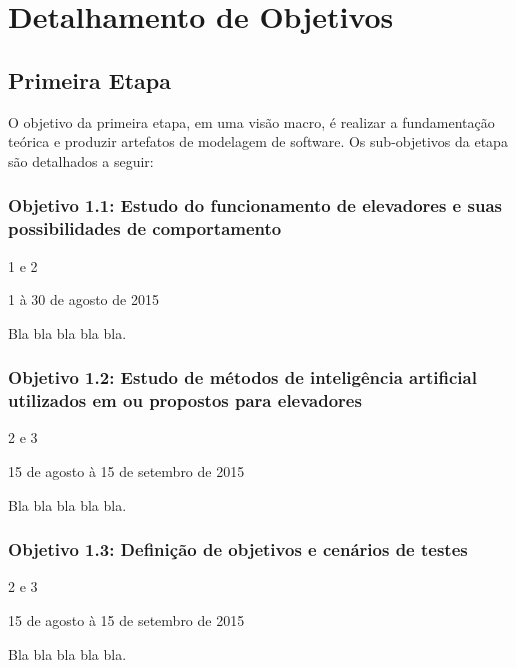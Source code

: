 \section{\label{section:objectives}Detalhamento de Objetivos}

\subsection{Primeira Etapa}

O objetivo da primeira etapa, em uma visão macro, é realizar a fundamentação
teórica e produzir artefatos de modelagem de software. Os sub-objetivos da etapa
são detalhados a seguir:

\subsubsection{\textbf{Objetivo 1.1}: Estudo do funcionamento de elevadores e suas possibilidades de comportamento}

\begin{description}[leftmargin=!,labelwidth=\widthof{\bfseries Descrição}]
  \item[Iterações] 1 e 2
  \item[Período]   1 à 30 de agosto de 2015
  \item[Descrição] Bla bla bla bla bla.
\end{description}

\subsubsection{\textbf{Objetivo 1.2}: Estudo de métodos de inteligência artificial utilizados em ou propostos para elevadores}

\begin{description}[leftmargin=!,labelwidth=\widthof{\bfseries Descrição}]
  \item[Iterações] 2 e 3
  \item[Período]   15 de agosto à 15 de setembro de 2015
  \item[Descrição] Bla bla bla bla bla.
\end{description}

\subsubsection{\textbf{Objetivo 1.3}: Definição de objetivos e cenários de testes}

\begin{description}[leftmargin=!,labelwidth=\widthof{\bfseries Descrição}]
  \item[Iterações] 2 e 3
  \item[Período]   15 de agosto à 15 de setembro de 2015
  \item[Descrição] Bla bla bla bla bla.
\end{description}

